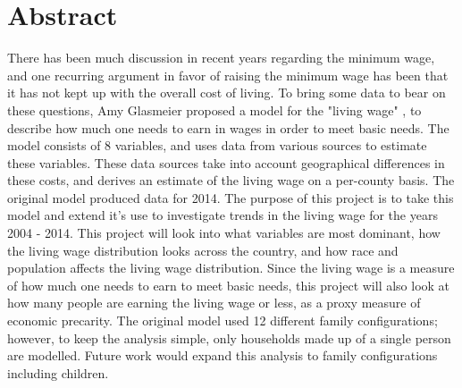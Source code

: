 \begingroup
\let\clearpage\relax
\let\cleardoublepage\relax
\let\cleardoublepage\relax

\chapter*{Abstract}

There has been much discussion in recent years regarding the minimum wage, and one recurring argument in favor of raising the minimum wage has been that it has not kept up with the overall cost of living. To bring some data to bear on these questions, Amy Glasmeier proposed a model for the "living wage" \cite{glasmeier2014}, to describe how much one needs to earn in wages in order to meet basic needs. The model consists of 8 variables, and uses data from various sources to estimate these variables. These data sources take into account geographical differences in these costs, and derives an estimate of the living wage on a per-county basis. The original model produced data for 2014. The purpose of this project is to take this model and extend it's use to investigate trends in the living wage for the years 2004 - 2014. This project will look into what variables are most dominant, how the living wage distribution looks across the country, and how race and population affects the living wage distribution. Since the living wage is a measure of how much one needs to earn to meet basic needs, this project will also look at how many people are earning the living wage or less, as a proxy measure of economic precarity. The original model used 12 different family configurations; however, to keep the analysis simple, only households made up of a single person are modelled. Future work would expand this analysis to family configurations including children.

